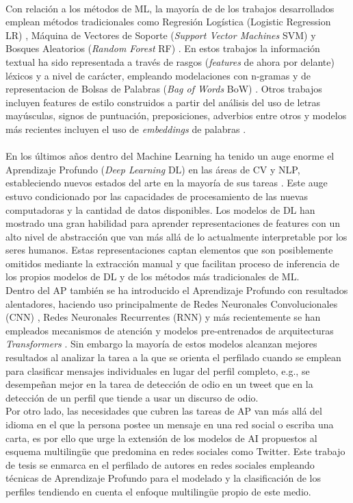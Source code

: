 \\
Con relación a los métodos de ML, la mayoría de de los trabajos desarrollados emplean métodos tradicionales como Regresión Logística (Logistic Regression LR) \citep{DBLP:conf/clef/Valencia-Valencia19}, Máquina de Vectores de Soporte (\textit{Support Vector Machines} SVM) \citep{DBLP:conf/clef/Pizarro19}  y Bosques Aleatorios (\textit{Random Forest} RF) \citep{DBLP:conf/clef/Johansson19}. En estos trabajos la información textual ha sido representada a través de rasgos (\textit{features} de ahora por delante)  léxicos y a nivel de carácter, empleando modelaciones con n-gramas y de representacion de Bolsas de Palabras (\textit{Bag of Words} BoW) \citep{DBLP:conf/clef/Pizarro19,DBLP:conf/clef/Valencia-Valencia19}. Otros trabajos incluyen features de estilo construidos a partir del análisis del uso de letras mayúsculas, signos de puntuación, preposiciones, adverbios entre otros y modelos más recientes incluyen el uso de \textit{embeddings} de palabras \citep{DBLP:conf/clef/JooH19,DBLP:conf/clef/Lopez-Santillan19}. 
\\
\\
En los últimos años dentro del Machine Learning ha tenido un auge enorme el Aprendizaje Profundo (\textit{Deep Learning} DL) en las áreas de CV y NLP, estableciendo nuevos estados del arte en la mayoría de sus tareas \citep{electronics8030292}. Este auge estuvo condicionado por las capacidades de procesamiento de las nuevas computadoras y la cantidad de datos disponibles. Los modelos de DL han mostrado una gran habilidad para aprender representaciones de features con un alto nivel de abstracción que van más allá de lo actualmente interpretable por los seres humanos. Estas representaciones captan elementos que son posiblemente omitidos mediante la extracción manual y que facilitan proceso de inferencia de los propios modelos de DL y de los métodos más tradicionales de ML. 
\\
Dentro del AP también se ha introducido el Aprendizaje Profundo con resultados alentadores, haciendo uso principalmente de Redes Neuronales Convolucionales (CNN) \citep{DBLP:conf/clef/PetrikC19}, Redes Neuronales Recurrentes (RNN) \citep{DBLP:conf/clef/DiasP19} y más recientemente se han empleados mecanismos de atención y modelos pre-entrenados de arquitecturas \textit{Transformers} \citep{iyer:2020}. Sin embargo la mayoría de estos modelos alcanzan mejores resultados al analizar la tarea a la que se orienta el perfilado cuando se emplean para clasificar mensajes individuales en lugar del perfil completo, e.g., se desempeñan mejor en la tarea de detección de odio en un tweet que en la detección de un perfil que tiende a usar un discurso de odio. 
\\
Por otro lado, las necesidades que cubren las tareas de AP van más allá del idioma en el que la persona postee un mensaje en una red social o escriba una carta, es por ello que urge la extensión de los modelos de AI propuestos al esquema multilingüe que predomina en redes sociales como Twitter. Este trabajo de tesis se enmarca en el perfilado de autores en redes sociales empleando técnicas de Aprendizaje Profundo para el modelado y la clasificación de los perfiles tendiendo en cuenta el enfoque multilingüe propio de este medio. 

